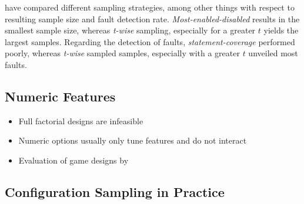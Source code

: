 \cite{medeiros_comparison_2016} have compared different sampling strategies,
among other things with respect to resulting sample size and fault detection
rate. \emph{Most-enabled-disabled} results in the smallest
sample size, whereas \emph{t-wise} sampling, especially for a greater $t$ yields
the largest samples. Regarding the detection of faults,
\emph{statement-coverage} performed poorly, whereas \emph{t-wise} sampled
samples, especially with a greater $t$ unveiled most faults. 

\subsection{Numeric Features}
\begin{itemize}
  \item Full factorial designs are infeasible
  \item Numeric options usually only tune features and do not interact
  \item Evaluation of game designs by \cite{siegmund_performance-influence_2015}
\end{itemize}

\subsection{Configuration Sampling in Practice}
